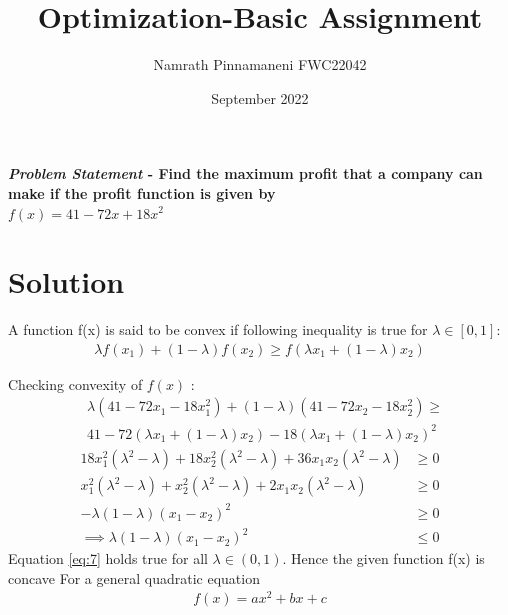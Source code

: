 \documentclass[journal,10pt,twocolumn]{article}
\title{\textbf{Optimization-Basic Assignment}}
\author{Namrath Pinnamaneni \hspace{9cm} FWC22042}
\date{September 2022}
\providecommand{\brak}[1]{\ensuremath{\left(#1\right)}}
\begin{document}
\maketitle
\paragraph{\textit{Problem Statement} - Find the maximum profit that a company can make if the profit function is given by \\ $f(x) = 41-72x+18x^2$}

\section*{\large Solution}

A function f(x) is said to be convex if following inequality is true for $\lambda \in [0,1] :$  \label{opt/2/1/a/lemma1}
\begin{align}
    \lambda f(x_1) + (1-\lambda)f(x_2) \geq f(\lambda x_1 + (1-\lambda)x_2)
    \label{eq:2}
\end{align}

Checking convexity of $f(x)$ :
\begin{equation}
\begin{aligned}
    &\lambda\brak{41-72x_1-18x_1^2} + (1-\lambda)\brak{41-72x_2-18x_2^2} \geq \\
    &41-72\brak{\lambda x_1 + (1-\lambda)x_2} - 18\brak{\lambda x_1 + (1-\lambda)x_2}^2
\end{aligned}
\end{equation}
\begin{align}
        18x_1^2\brak{{\lambda^2-\lambda}}+18x_2^2\brak{{\lambda^2-\lambda}}+36x_1x_2\brak{{\lambda^2-\lambda}} &\geq 0 \\
        x_1^2\brak{{\lambda^2-\lambda}}+x_2^2\brak{{\lambda^2-\lambda}}+2x_1x_2\brak{{\lambda^2-\lambda}} &\geq 0 \\
        -\lambda\brak{1-\lambda}\brak{x_1-x_2}^2 &\geq 0 \\
        \implies \lambda\brak{1-\lambda}\brak{x_1-x_2}^2 &\leq 0 \label{eq:7}
\end{align}
Equation \eqref{eq:7} holds true for all $\lambda\in(0,1)$. Hence the given function f(x) is concave
 For a general quadratic equation
\begin{align}
    f(x)=ax^2+bx+c
\end{align}
\end{document}
